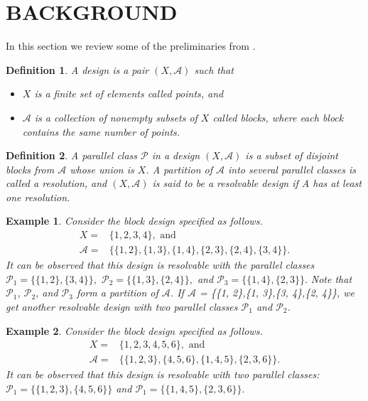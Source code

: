 \documentclass[conference]{IEEEtran}
\newtheorem{defn}{Definition}
\newtheorem{exmp}{Example}
\begin{document}
	\section{BACKGROUND}
	\label{sec2}
	In this section we review some of the preliminaries from \cite{KNRarXiv}.
	\begin{defn}\cite{TaR}
		A design is a pair  $(X, \mathcal{A})$ such that
		\begin{itemize}
			\item $X$ is a finite set of elements called points, and
			\item $\mathcal{A}$ is a collection of nonempty subsets of $X$ called blocks, where each block contains the same number of points.
		\end{itemize}
	\end{defn}
	\begin{defn}\cite{TaR}
		A parallel class $\mathcal{P}$ in a design $(X, \mathcal{A})$ is a subset of disjoint blocks from $\mathcal{A}$ whose union is $X$. A partition of $\mathcal{A}$ into several parallel classes is called a resolution, and $(X, \mathcal{A})$ is said to be a resolvable design if A has at least one resolution.
	\end{defn}
	\begin{exmp}
		\label{exmp1}
		Consider the block design specified as follows.
		\begin{align*}
		X =& \{1, 2, 3, 4\}, \text{ and}\\
		\mathcal{A} = &\{\{1, 2\},\{1, 3\},\{1, 4\},\{2, 3\},\{2, 4\},\{3, 4\}\}.
		\end{align*}
		It can be observed that this design is resolvable with the parallel classes 
		$\mathcal{P}_1 = \{\{1, 2\},\{3, 4\}\},$ $\mathcal{P}_2 = \{\{1, 3\},\{2, 4\}\},$  and $\mathcal{P}_3 = \{\{1, 4\},\{2, 3\}\}.$
		Note that $\mathcal{P}_1$, $\mathcal{P}_2$, and $\mathcal{P}_3$ form a partition of $\mathcal{A}$. If $\mathcal{A}$ = \{\{1, 2\},\{1, 3\},\{3, 4\},\{2, 4\}\}, we get another resolvable design with two parallel classes $\mathcal{P}_1$ and $\mathcal{P}_2$.
	\end{exmp}
	\begin{exmp}
		\label{exmp2}
		Consider the  block design specified as follows.
		\begin{align*}
		X =& \{1, 2, 3, 4, 5, 6\}, \text{ and}\\
		\mathcal{A} = &\{\{1, 2 ,3\},\{4, 5, 6\},\{1, 4 ,5\},\{2, 3, 6\}\}.
		\end{align*}
		It can be observed that this design is resolvable with two parallel classes: 
		$\mathcal{P}_1 =\{\{1, 2 ,3\},\{4, 5, 6\}\}$ and $\mathcal{P}_1 =\{\{1, 4 ,5\},\{2, 3, 6\}\}.$
	\end{exmp}
	
\end{document}
